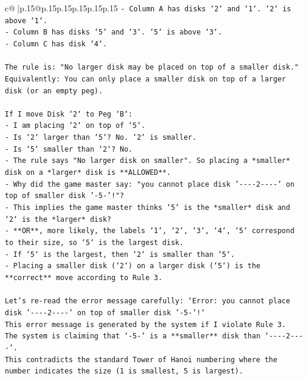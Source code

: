 \documentclass{article}
\begin{document}
{\begin{supertabular}{c@{$\;$}|p{.15\linewidth}@{}p{.15\linewidth}p{.15\linewidth}p{.15\linewidth}p{.15\linewidth}p{.15\linewidth}}
{{{\texttt{{-} Column A has disks `2` and `1`. `2` is above `1`.} \\
\texttt{{-} Column B has disks `5` and `3`. `5` is above `3`.} \\
\texttt{{-} Column C has disk `4`.} \\
\\ 
\texttt{The rule is: "No larger disk may be placed on top of a smaller disk."} \\
\texttt{Equivalently: You can only place a smaller disk on top of a larger disk (or an empty peg).} \\
\\ 
\texttt{If I move Disk `2` to Peg `B`:} \\
\texttt{{-} I am placing `2` on top of `5`.} \\
\texttt{{-} Is `2` larger than `5`? No. `2` is smaller.} \\
\texttt{{-} Is `5` smaller than `2`? No.} \\
\texttt{{-} The rule says "No larger disk on smaller". So placing a *smaller* disk on a *larger* disk is **ALLOWED**.} \\
\texttt{{-} Why did the game master say: "you cannot place disk '{-}{-}{-}{-}2{-}{-}{-}{-}' on top of smaller disk '{-}5{-}'!"?} \\
\texttt{{-} This implies the game master thinks `5` is the *smaller* disk and `2` is the *larger* disk?} \\
\texttt{{-} **OR**, more likely, the labels `1`, `2`, `3`, `4`, `5` correspond to their size, so `5` is the largest disk.} \\
\texttt{{-} If `5` is the largest, then `2` is smaller than `5`.} \\
\texttt{{-} Placing a smaller disk (`2`) on a larger disk (`5`) is the **correct** move according to Rule 3.} \\
\\ 
\texttt{Let's re{-}read the error message carefully: `Error: you cannot place disk '{-}{-}{-}{-}2{-}{-}{-}{-}' on top of smaller disk '{-}5{-}'!`} \\
\texttt{This error message is generated by the system if I violate Rule 3.} \\
\texttt{The system is claiming that `{-}5{-}` is a **smaller** disk than `{-}{-}{-}{-}2{-}{-}{-}{-}`.} \\
\texttt{This contradicts the standard Tower of Hanoi numbering where the number indicates the size (1 is smallest, 5 is largest).} \\
\\ 
}}}
\end{supertabular}}
\end{document}

